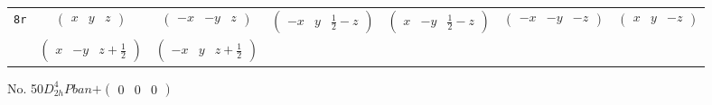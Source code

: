 \documentclass[fleqn,9pt,landscape]{jsarticle}
\begin{document}
\begin{center}
\begin{longtable}{ccccccc}
{\tt 8r} & $ \begin{pmatrix} x & y & z \end{pmatrix} $ & $ \begin{pmatrix} - x & - y & z \end{pmatrix} $ & $ \begin{pmatrix} - x & y & \frac{1}{2} - z \end{pmatrix} $ & $ \begin{pmatrix} x & - y & \frac{1}{2} - z \end{pmatrix} $ & $ \begin{pmatrix} - x & - y & - z \end{pmatrix} $ & $ \begin{pmatrix} x & y & - z \end{pmatrix} $ \\
& $ \begin{pmatrix} x & - y & z + \frac{1}{2} \end{pmatrix} $ & $ \begin{pmatrix} - x & y & z + \frac{1}{2} \end{pmatrix} $ & $  $ & $  $ & $  $ & $  $ \\
\end{longtable}
\end{center}
\newpage
No. 50\quad$D_{2h}^{4}$\quad$Pban$\quad[ orthorhombic ]\quad$+\begin{pmatrix} 0 & 0 & 0 \end{pmatrix}$
\end{document}
